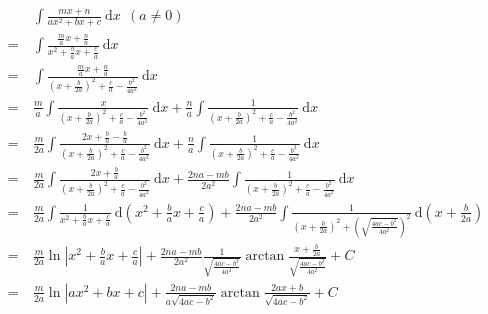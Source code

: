 \documentclass{article}
\begin{document}
	\large
	\setlength{\baselineskip}{4em}
	
	\renewcommand{\d}[1][x]{\ \text{d}#1}
	\renewcommand{\c}{+ C}
	\newcommand{\mdelta}{4 a c - b^2}
	\newcommand{\f}{\frac}
	\newcommand{\denA}{x^2 + \f{b}{a} x + \f{c}{a}}
	\newcommand{\denB}{(x + \f{b}{2 a})^2 + \f{c}{a} - \f{b^2}{4 a^2}}
	
	\begin{align*}
		&\ \int \f{mx + n}{a x^2 + b x + c} \d \ \ (a \neq 0)
		\\
		= &\ \int \f{\f{m}{a} x + \f{n}{a}}{\denA} \d
		\\
		= &\ \int \f{\f{m}{a} x + \f{n}{a}}{\denB} \d
		\\
		= &\ \f{m}{a} \int \f{x}{\denB} \d + \f{n}{a} \int \f{1}{\denB} \d
		\\
		= &\ \f{m}{2 a} \int \f{2 x + \f{b}{a} - \f{b}{a}}{\denB} \d + \f{n}{a} \int \f{1}{\denB} \d
		\\
		= &\ \f{m}{2 a} \int \f{2 x + \f{b}{a}}{\denB} \d + \f{2 n a - m b}{2 a^2} \int \f{1}{\denB} \d
		\\
		= &\ \f{m}{2 a} \int \f{1}{\denA} \d[(\denA)] + \f{2 n a - m b}{2 a^2} \int \f{1}{(x + \f{b}{2 a})^2 + (\sqrt{\f{\mdelta}{4 a^2}})^2} \d[(x + \f{b}{2 a})]
		\\
		= &\ \f{m}{2 a} \ln{|\denA|} + \f{2 n a - m b}{2 a^2} \f{1}{\sqrt{\f{\mdelta}{4 a^2}}} \arctan\f{x + \f{b}{2 a}}{\sqrt{\f{\mdelta}{4 a^2}}} \c
		\\
		= &\ \f{m}{2 a} \ln{|a x^2 + b x + c|} + \f{2 n a - m b}{a\sqrt{\mdelta}} \arctan\f{2 a x + b}{\sqrt{\mdelta}} \c
	\end{align*}
\end{document}
